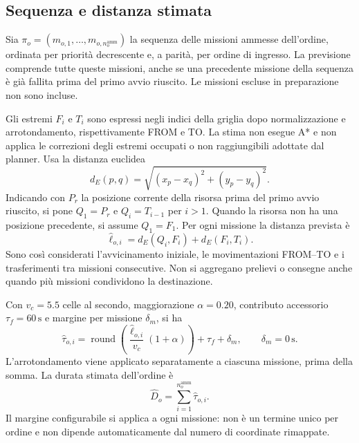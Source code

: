 \subsection{Sequenza e distanza stimata}

Sia $\pi_o=(m_{o,1},\ldots,m_{o,n_o^{\mathrm{amm}}})$ la sequenza delle
missioni ammesse dell'ordine, ordinata per priorità decrescente e, a parità,
per ordine di ingresso. La previsione comprende tutte queste missioni,
anche se una precedente missione della sequenza è già fallita prima del
primo avvio riuscito. Le missioni escluse in preparazione non sono incluse.

Gli estremi $F_i$ e $T_i$ sono espressi negli indici della griglia dopo
normalizzazione e arrotondamento, rispettivamente FROM e TO. La stima non esegue A* e non applica le
correzioni degli estremi occupati o non raggiungibili adottate dal planner.
Usa la distanza euclidea
\begin{equation}
    d_E(p,q)=\sqrt{(x_p-x_q)^2+(y_p-y_q)^2}.
    \label{eq:manhattan-distance}
\end{equation}
Indicando con $P_r$ la posizione corrente della risorsa prima del primo
avvio riuscito, si pone $Q_1=P_r$ e $Q_i=T_{i-1}$ per $i>1$. Quando la
risorsa non ha una posizione precedente, si assume $Q_1=F_1$. Per ogni
missione la distanza prevista è
\begin{equation}
    \widehat\ell_{o,i}=d_E(Q_i,F_i)+d_E(F_i,T_i).
    \label{eq:estimated-order-distance}
\end{equation}
Sono così considerati l'avvicinamento iniziale, le movimentazioni FROM--TO
e i trasferimenti tra missioni consecutive. Non si aggregano prelievi o
consegne anche quando più missioni condividono la destinazione.

Con $v_c=5.5$ celle al secondo, maggiorazione $\alpha=0.20$, contributo
accessorio $\tau_f=60\,\mathrm{s}$ e margine per missione $\delta_m$, si ha
\begin{equation}
    \widehat\tau_{o,i}=
    \operatorname{round}\!\left(
       \frac{\widehat\ell_{o,i}}{v_c}(1+\alpha)\right)
       +\tau_f+\delta_m,
    \qquad \delta_m=0\,\mathrm{s}.
    \label{eq:stima_scadenze}
\end{equation}
L'arrotondamento viene applicato separatamente a ciascuna missione, prima
della somma. La durata stimata dell'ordine è
\begin{equation}
    \widehat D_o=\sum_{i=1}^{n_o^{\mathrm{amm}}}\widehat\tau_{o,i}.
    \label{eq:estimated-order-duration}
\end{equation}
Il margine configurabile si applica a ogni missione: non è un termine unico
per ordine e non dipende automaticamente dal numero di coordinate rimappate.

